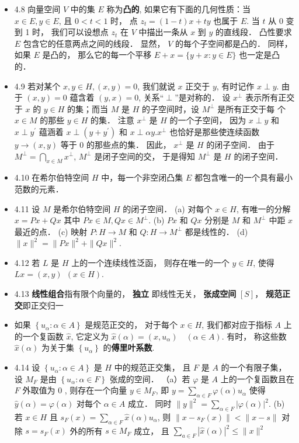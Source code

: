 \begin{itemize}
\item 4.8 向量空间 $V$ 中的集 $E$ 称为\textbf{凸的}, 如果它有下面的几何性质：当 $x \in E, y \in E$, 且 $0<t<1$ 时， 点 $z_{t}=(1-t) x+t y$ 也属于 $E$. 当 $t$ 从 0 变到 1 时， 我们可以设想点 $z_{t}$ 在 $V$ 中描出一条从 $x$ 到 $y$ 的直线段． 凸性要求 $E$ 包含它的任意两点之间的线段． 显然， $V$ 的每个子空间都是凸的． 同样， 如果 $E$ 是凸的， 那么它的每一个平移 $E+x=\{y+x: y \in E\}$ 也一定是凸的．

\item 4.9 若对某个 $x,y \in H,(x, y)=0$, 我们就说 $x$ 正交于 $y$, 有时记作 $x \perp y$. 由于 $(x, y)=0$ 蕴含着 $(y, x)=0$, 关系“$\perp$”是对称的． 设 $x^{\perp}$ 表示所有正交于 $x$ 的 $y \in H$ 的集；而当 $M$ 是 $H$ 的子空间时，设 $M^{\perp}$ 是所有正交于每 个 $x \in M$ 的那些 $y \in H$ 的集． 注意 $x^{\perp}$ 是 $H$ 的一个子空间， 因为 $x \perp y$ 和 $x \perp y^{\prime}$ 蕴涵着 $x \perp\left(y+y^{\prime}\right)$ 和 $x \perp \alpha y . x^{\perp}$ 也恰好是那些使连续函数 $y \rightarrow(x, y)$ 等于 0 的那些点的集． 因此， $x^{\perp}$ 是 $H$ 的闭子空间． 由于 $M^{\perp}=\bigcap_{x \in M} x^{\perp}$, $M^{\perp}$ 是闭子空间的交， 于是得知 $M^{\perp}$ 是 $H$ 的闭子空间．

\item 4.10 在希尔伯特空间 $H$ 中，每一个非空闭凸集 $E$ 都包含唯一的一个具有最小范数的元素．

\item 4.11 设 $M$ 是希尔伯特空间 $H$ 的闭子空间． (a) 对每个 $x \in H$, 有唯一的分解 $x=P x+Q x$ 其中 $P x \in M, Q x \in M^{\perp}$. (b) $P x$ 和 $Q x$ 分别是 $M$ 和 $M^{\perp}$ 中距 $x$ 最近的点． (c) 映射 $P: H \rightarrow M$ 和 $Q: H \rightarrow M^{\perp}$ 都是线性的． (d) $\|x\|^{2}=\|P x\|^{2}+\|Q x\|^{2}$.

\item 4.12 若 $L$ 是 $H$ 上的一个连续线性泛函， 则存在唯一的一个 $y \in H$, 使得 $L x=(x, y)\ \ (x \in H)$.

\item 4.13 \textbf{线性组合}指有限个向量的， \textbf{独立} 即线性无关， \textbf{张成空间} $[S]$， \textbf{规范正交}即正交归一

\item 如果 $\left\{u_{\alpha}: \alpha \in A\right\}$ 是规范正交的， 对于每个 $x \in H$, 我们都对应于指标 $A$ 上的一个复函数 $\hat{x}$, 它定义为 $\hat{x}(\alpha)=\left(x, u_{\alpha}\right) \quad(\alpha \in A)$. 有时， 称这些数 $\hat{x}(\alpha)$ 为关于集 $\left\{u_{\alpha}\right\}$ 的\textbf{傅里叶系数}.

\item 4.14 设 $\left\{u_{\alpha}: \alpha \in A\right\}$ 是 $H$ 中的规范正交集， 且 $F$ 是 $A$ 的一个有限子集， 设 $M_{F}$ 是由 $\left\{u_{\alpha}: \alpha \in F\right\}$ 张成的空间．
（a）若 $\varphi$ 是 $A$ 上的一个复函数且在 $F$ 外取值为 0 , 则存在一个向量 $y \in M_{F}$, 即 $y =\sum_{\alpha \in F} \varphi(\alpha) u_{\alpha}$ 使得 $\hat y(\alpha)=\varphi(\alpha)$ 对每个 $\alpha \in A$ 成立． 同时 $\|y\|^{2} =\sum_{\alpha \in F}|\varphi(\alpha)|^{2}$.
(b) 若 $x \in H$ 且 $s_{F}(x)=\sum_{\alpha \in F} \hat{x}(\alpha) u_{\alpha}$, 则 $\left\|x-s_{F}(x)\right\|<\|x-s\|$ 对除 $s=s_{F}(x)$ 外的所有 $s \in M_{F}$ 成立， 且 $\sum_{a \in F}|\hat{x}(\alpha)|^{2} \leqslant\|x\|^{2}$


\end{itemize}
